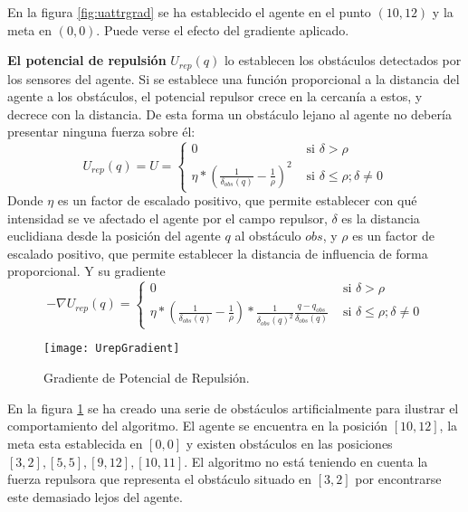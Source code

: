 En la figura \ref{fig:uattrgrad} se ha establecido el agente en el punto $(10,12)$ y la meta en $(0,0)$. Puede verse el efecto del gradiente aplicado.

\textbf{El potencial de repulsión} $U_{rep}(q)$ lo establecen los obstáculos detectados por los sensores del agente. Si se establece una función proporcional a la distancia del agente a los obstáculos, el potencial repulsor crece en la cercanía a estos, y decrece con la distancia. De esta forma un obstáculo lejano al agente no debería presentar ninguna fuerza sobre él:
\begin{equation}
U_{rep}(q) = U = \begin{cases}
0 & \text{ si } \delta > \rho \\ 
\eta * (\frac{1}{\delta_{obs}(q)}-\frac{1}{\rho})^2 & \text{ si } \delta \leq \rho; \delta \neq 0 
\end{cases}
\label{equation:Urepq}
\end{equation}
Donde $\eta$ es un factor de escalado positivo, que permite establecer con qué intensidad se ve afectado el agente por el campo repulsor, $\delta$ es la distancia euclidiana desde la posición del agente $q$ al obstáculo $obs$, y $\rho$ es un factor de escalado positivo, que permite establecer la distancia de influencia de forma proporcional. Y su gradiente
\begin{equation}
-\nabla U_{rep}(q) = \begin{cases} 0 & \text{ si } \delta > \rho \\
\eta * (\frac{1}{\delta_{obs}(q)}-\frac{1}{\rho}) * \frac{1}{\delta_{obs}(q)^2}\frac{q-q_{obs}}{\delta_{obs}(q)} & \text{ si }  \delta \leq \rho; \delta \neq 0  
\end{cases}
\label{equation:dUrepq}
\end{equation}
\begin{figure}[H]
	\centering
	\texttt{[image: UrepGradient]}
	\caption{Gradiente de Potencial de Repulsión.}\label{fig:urepgrad}
\end{figure}

 En la figura \ref{fig:urepgrad} se ha creado una serie de obstáculos artificialmente para ilustrar el comportamiento del algoritmo. El agente se encuentra en la posición $[10, 12]$, la meta esta establecida en $[0, 0]$ y existen obstáculos en las posiciones $[3, 2], [5, 5], [9, 12], [10, 11]$. El algoritmo no está teniendo en cuenta la fuerza repulsora que representa el obstáculo situado en $[3, 2]$ por encontrarse este demasiado lejos del agente.

